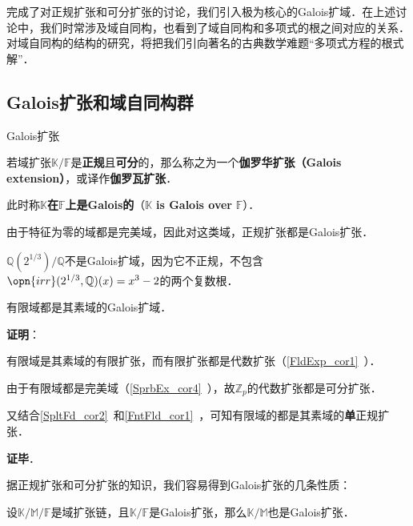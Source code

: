 

完成了对正规扩张和可分扩张的讨论，我们引入极为核心的Galois扩域．在上述讨论中，我们时常涉及域自同构，也看到了域自同构和多项式的根之间对应的关系．对域自同构的结构的研究，将把我们引向著名的古典数学难题“多项式方程的根式解”．



\subsection{Galois扩张和域自同构群}

\begin{definition}{Galois扩张}

若域扩张$\mathbb{K}/\mathbb{F}$是\textbf{正规}且\textbf{可分}的，那么称之为一个\textbf{伽罗华扩张（Galois extension）}，或译作\textbf{伽罗瓦扩张}．

此时称$\mathbb{K}$\textbf{在}$\mathbb{F}$\textbf{上是Galois的}（$\mathbb{K}$ \textbf{is Galois over} $\mathbb{F}$）．

\end{definition}

由于特征为零的域都是完美域，因此对这类域，正规扩张都是Galois扩张．

\begin{example}{}
$\mathbb{Q}(2^{1/3})/\mathbb{Q}$不是Galois扩域，因为它不正规，不包含$\opn{irr}(2^{1/3}, \mathbb{Q})(x)=x^3-2$的两个复数根．
\end{example}

\begin{theorem}{}
有限域都是其素域的Galois扩域．
\end{theorem}

\textbf{证明}：

有限域是其素域的有限扩张，而有限扩张都是代数扩张（\autoref{FldExp_cor1}~）．

由于有限域都是完美域（\autoref{SprbEx_cor4}~），故$\mathbb{Z}_p$的代数扩张都是可分扩张．

又结合\autoref{SpltFd_cor2}~和\autoref{FntFld_cor1}~，可知有限域的都是其素域的\textbf{单}正规扩张．

\textbf{证毕}．


据正规扩张和可分扩张的知识，我们容易得到Galois扩张的几条性质：


\begin{theorem}{}
设$\mathbb{K}/\mathbb{M}/\mathbb{F}$是域扩张链，且$\mathbb{K}/\mathbb{F}$是Galois扩张，那么$\mathbb{K}/\mathbb{M}$也是Galois扩张．
\end{theorem}

